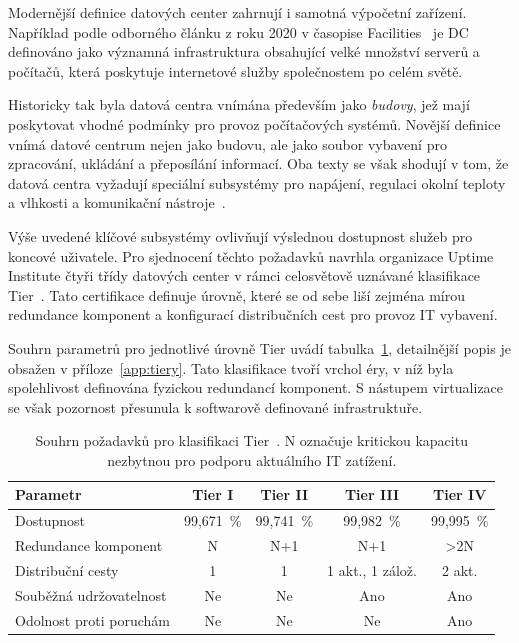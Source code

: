 Modernější definice datových center zahrnují i samotná výpočetní zařízení. Například podle odborného článku z roku 2020 v časopise Facilities~\cite{fadaeefath_abadi_data_2020} je DC definováno jako významná infrastruktura obsahující velké množství serverů a počítačů, která poskytuje internetové služby společnostem po celém světě.

Historicky tak byla datová centra vnímána především jako \textit{budovy}, jež mají poskytovat vhodné podmínky pro provoz počítačových systémů. Novější definice vnímá datové centrum nejen jako budovu, ale jako soubor vybavení pro zpracování, ukládání a přeposílání informací. Oba texty se však shodují v tom, že datová centra vyžadují speciální subsystémy pro napájení, regulaci okolní teploty a vlhkosti a komunikační nástroje~\cite{tatnall_reflections_2012, fadaeefath_abadi_data_2020}.

Výše uvedené klíčové subsystémy ovlivňují výslednou dostupnost služeb pro koncové uživatele. Pro sjednocení těchto požadavků navrhla organizace Uptime Institute čtyři třídy datových center v rámci celosvětově uznávané klasifikace Tier~\cite{turner_iv_tier_2008}. Tato certifikace definuje úrovně, které se od sebe liší zejména mírou redundance komponent a konfigurací distribučních cest pro provoz IT vybavení.

Souhrn parametrů pro jednotlivé úrovně Tier uvádí tabulka~\ref{tab:uptime_tiers}, detailnější popis je obsažen v příloze~\ref{app:tiery}. Tato klasifikace tvoří vrchol éry, v níž byla spolehlivost definována fyzickou redundancí komponent. S nástupem virtualizace se však pozornost přesunula k softwarově definované infrastruktuře.

\begin{table}[t] \centering \setlength{\tabcolsep}{4pt}
    
    \begin{tabular}{lcccc}
        \toprule
        \textbf{Parametr} & \textbf{Tier I} & \textbf{Tier II} & \textbf{Tier III} & \textbf{Tier IV} \\
        \midrule
        Dostupnost & 99,671~\% & 99,741~\% & 99,982~\% & 99,995~\% \\
        Redundance komponent & N & N+1 & N+1 & >2N \\
        Distribuční cesty & 1 & 1 & 1 akt., 1 zálož. & 2 akt. \\
        Souběžná udržovatelnost & Ne & Ne & Ano & Ano \\
        Odolnost proti poruchám & Ne & Ne & Ne & Ano \\
        \bottomrule
    \end{tabular}
    
    \caption{Souhrn požadavků pro klasifikaci Tier~\cite[s.~13]{turner_iv_tier_2008}. N označuje kritickou kapacitu nezbytnou pro podporu aktuálního IT zatížení.}
    \label{tab:uptime_tiers}

\end{table}

